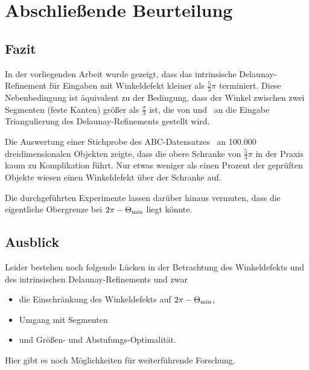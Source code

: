 
\chapter{ Abschließende Beurteilung}
\section*{Fazit}
 
In der vorliegenden Arbeit wurde gezeigt, dass das intrinsische Delaunay-Refinement für Eingaben mit Winkeldefekt kleiner als $\frac{5}{3}\pi$ terminiert.
Diese Nebenbedingung ist äquivalent zu der Bedingung, dass der Winkel zwischen zwei Segmenten (feste Kanten) größer als $\frac{\pi}{3}$ ist, die von  \citeauthor{SHEWCHUK:2002:chuws} und~\citeauthor{ruppert:1995:delaunay} an die Eingabe Triangulierung des Delaunay-Refinements gestellt wird. 

 
Die Auswertung einer Stichprobe des ABC-Datensatzes~\cite{Koch_2019_CVPR} an 100.000 dreidimensionalen Objekten zeigte, dass die obere Schranke von  $\frac{5}{3}\pi$ in der Praxis kaum zu Komplikation führt.  Nur etwas weniger als einen Prozent der geprüften Objekte wiesen einen Winkeldefekt über der Schranke auf.

Die durchgeführten Experimente lassen darüber hinaus vermuten, dass die eigentliche Obergrenze bei $ 2 \pi -  \kleinsterWinkel*$ liegt könnte.


\section*{Ausblick}
Leider bestehen noch folgende Lücken in der Betrachtung des Winkeldefekts und des intrinsischen Delaunay-Refinements und zwar

\begin{itemize}
    \item die  Einschränkung des Winkeldefekts auf $ 2 \pi -  \kleinsterWinkel*$,
    \item Umgang mit Segmenten
    \item und Größen- und Abstufungs-Optimalität.
\end{itemize} 

 Hier gibt es noch Möglichkeiten für weiterführende Forschung.



